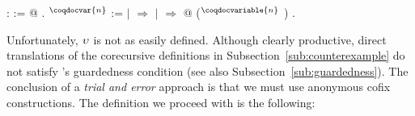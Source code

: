 \begin{singlespace}
\begin{coqdoccode}
\coqdocnoindent
{}
:  :=
 @
.\coqdoceol
\coqdocemptyline
\coqdocnoindent
{}
$^\coqdocvar{n}$
 :=\coqdoceol
\coqdocindent{1.00em}
  \coqdoceol
\coqdocindent{1.00em}
\ensuremath{|}
\ensuremath{\Rightarrow} \coqdoceol
\coqdocindent{1.00em}
\ensuremath{|}
 \ensuremath{\Rightarrow}
 @
($^\coqdocvariable{n}$
)\coqdoceol
\coqdocindent{1.00em}
.\coqdoceol
\end{coqdoccode}
\end{singlespace}
Unfortunately, $\upsilon$ is not as easily defined. Although clearly
productive, direct translations of the corecursive definitions in
Subsection~\ref{sub:counterexample} do not satisfy \Coq's guardedness
condition (see also Subsection~\ref{sub:guardedness}). The conclusion of
a \emph{trial and error} approach is that we must use anonymous cofix
constructions. The definition we proceed with is the following:
